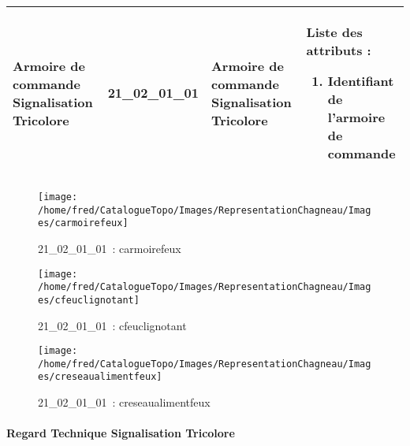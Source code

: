 \documentclass[12pt,titlepage]{book}
\begin{document}
\renewcommand{\arraystretch}{1.2}
\begin{supertabular}{|p{10cm}|c|p{13cm}|p{12cm}|}
 Armoire de commande Signalisation Tricolore & 21\_02\_01\_01 & Armoire de commande Signalisation Tricolore & Liste des attributs :
\begin{enumerate}
  \item Identifiant de l'armoire de commande\end{enumerate}
\\
\hline
\end{supertabular}
\begin{figure}[h!]
  \hfill         %
  \begin{minipage}[t]{3cm}
    \begin{center}
      \texttt{[image: /home/fred/CatalogueTopo/Images/RepresentationChagneau/Images/carmoirefeux]}
      \caption[~21\_02\_01\_01]{\small{21\_02\_01\_01~:} \tiny{carmoirefeux}}\label{carmoirefeux}
    \end{center}
  \end{minipage}
  \begin{minipage}[t]{3cm}
    \begin{center}
      \texttt{[image: /home/fred/CatalogueTopo/Images/RepresentationChagneau/Images/cfeuclignotant]}
      \caption[~21\_02\_01\_01]{\small{21\_02\_01\_01~:} \tiny{cfeuclignotant}}\label{cfeuclignotant}
    \end{center}
  \end{minipage}
  \begin{minipage}[t]{3cm}
    \begin{center}
      \texttt{[image: /home/fred/CatalogueTopo/Images/RepresentationChagneau/Images/creseaualimentfeux]}
      \caption[~21\_02\_01\_01]{\small{21\_02\_01\_01~:} \tiny{creseaualimentfeux}}\label{creseaualimentfeux}
    \end{center}
  \end{minipage}
\end{figure}


\paragraph{Regard Technique Signalisation Tricolore}
\noindent
\vspace{\baselineskip}
\end{document}
